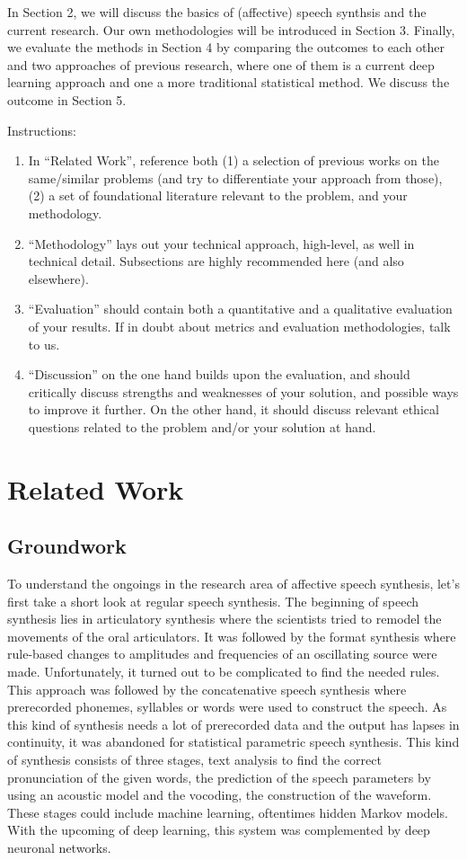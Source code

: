\documentclass[11pt]{article}
\begin{document}
In Section 2, we will discuss the basics of (affective) speech synthsis and the current research. Our own methodologies will be introduced in Section 3. Finally, we evaluate the methods in  Section 4 by comparing the outcomes to each other and two approaches of previous research, where one of them is a current deep learning approach and one a more traditional statistical method. We discuss the outcome in Section 5.

Instructions: 
\begin{enumerate}

    \item In ``Related Work'', reference both (1) a selection of previous works on the same/similar problems (and try to differentiate your approach from those), (2) a set of foundational literature relevant to the problem, and your methodology.
    \item ``Methodology'' lays out your technical approach, high-level, as well in technical detail. Subsections are highly recommended here (and also elsewhere).
    \item ``Evaluation'' should contain both a quantitative and a qualitative evaluation of your results. If in doubt about metrics and evaluation methodologies, talk to us.
    \item ``Discussion'' on the one hand builds upon the evaluation, and should critically discuss strengths and weaknesses of your solution, and possible ways to improve it further. On the other hand, it should discuss relevant ethical questions related to the problem and/or your solution at hand.
\end{enumerate}




\section{Related Work}
\subsection{Groundwork}
To understand the ongoings in the research area of affective speech synthesis, let’s first take a short look at regular speech synthesis. The beginning of speech synthesis lies in articulatory synthesis where the scientists tried to remodel the movements of the oral articulators. It was followed by the format synthesis where rule-based changes to amplitudes and frequencies of an oscillating source were made. Unfortunately, it turned out to be complicated to find the needed rules. This approach was followed by the concatenative speech synthesis where prerecorded phonemes, syllables or words were used to construct the speech. As this kind of synthesis needs a lot of prerecorded data and the output has lapses in continuity, it was abandoned for statistical parametric speech synthesis. This kind of synthesis consists of three stages, text analysis to find the correct pronunciation of the given words, the prediction of the speech parameters by using an acoustic model and the vocoding, the construction of the waveform. These stages could include machine learning, oftentimes hidden Markov models. With the upcoming of deep learning, this system was complemented by deep neuronal networks.
\end{document}
